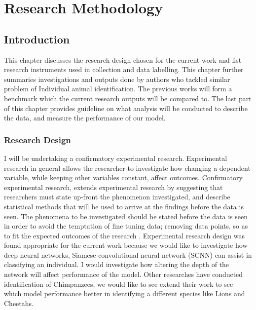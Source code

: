 %
%
%

\chapter{Research Methodology}
\section{Introduction}
This chapter discusses the research design chosen for the current work and list research instruments used in collection and data labelling. This chapter further summaries investigations and outputs done by authors who tackled similar problem of Individual animal identification. The previous works will form a benchmark which the current research outputs will be compared to. The last part of this chapter provides guideline on what analysis will be conducted to describe the data, and measure the performance of our model.
\subsection{Research Design}
I will be undertaking a confirmatory experimental research. Experimental research in general allows the researcher to investigate how changing a dependent variable, while keeping other variables constant, affect outcomes. Confirmatory experimental research, extends experimental research by suggesting that researchers must state up-front the phenomenon investigated, and describe statistical methods that will be used to arrive at the findings before the data is seen. The phenomena to be investigated should be stated before the data is seen in order to avoid the temptation of fine tuning data; removing data points, so as to fit the expected outcomes of the research \cite{wagenmakers2012agenda}. Experimental research design was found appropriate for the current work because we would like to investigate how deep neural networks, Siamese convolutional neural network (SCNN) can assist in classifying an individual. I would investigate how altering the depth of the network will affect performance of the model. Other researches have conducted identification of Chimpanzees, we would like to see extend their work to see which model performance better in identifying a different species like Lions and Cheetahs.   
